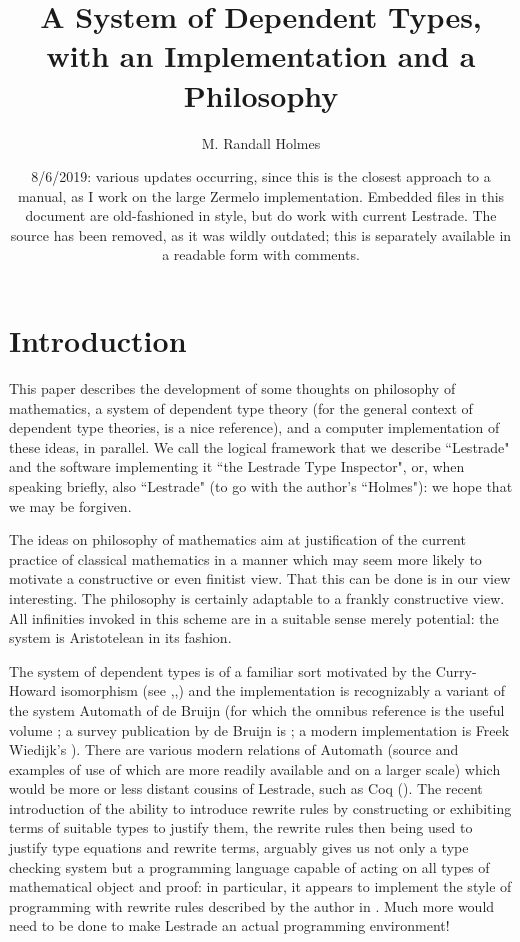 \documentclass[12pt]{article}
\title{A System of Dependent Types, with an Implementation and a Philosophy}
\author{M. Randall Holmes}
\date{8/6/2019:  various updates occurring, since this is the closest approach to a manual, as I work on the large Zermelo implementation.  Embedded files in this document are old-fashioned in style, but do work with current Lestrade.  The source has been removed, as it was wildly outdated;  this is separately available in a readable form with comments.}
\begin{document}
\maketitle

\newpage

\tableofcontents

\newpage

\section{Introduction}

This paper describes the development of some thoughts on philosophy of mathematics, a system of dependent type theory (for the general context of dependent type theories, \cite{barendregt} is a nice reference), and a computer implementation of these ideas, in parallel.  We call the logical framework that we describe ``Lestrade" and the software implementing it ``the Lestrade Type Inspector", or, when speaking briefly, also ``Lestrade"  (to go with the author's ``Holmes"):  we hope that we may be forgiven.

The ideas on philosophy of mathematics aim at justification of the current practice of classical mathematics in a manner which may seem more likely to motivate a constructive or even finitist view.  That this can be done is in our view interesting.   The philosophy is certainly adaptable to a frankly constructive view.  All infinities invoked in this scheme are in a suitable sense merely potential:  the system is Aristotelean in its fashion.

The system of dependent types is of a familiar sort motivated by the Curry-Howard isomorphism (see \cite{curryfeys},\cite{howard},\cite{debruijntypes}) and the implementation is recognizably a variant of the system Automath of de Bruijn (for which the omnibus reference is the useful volume \cite{automathbook}; a survey publication by de Bruijn is \cite{thelanguage};  a modern implementation is Freek Wiedijk's \cite{freek}).  There are various modern relations of Automath (source and examples of use of which are more readily available and on a larger scale) which would be more or less distant cousins of Lestrade, such as Coq  (\cite{coq}).  The recent introduction of the ability to introduce rewrite rules by constructing or exhibiting terms of suitable types to justify them, the rewrite rules then being used to justify type equations and rewrite terms, arguably gives us not only a type checking system but a programming language capable of acting on all types of mathematical object and proof:  in particular, it appears to implement the style of programming with rewrite rules described by the author in \cite{holmesrewriting}.   Much more would need to be done to make Lestrade an actual programming environment!
\end{document}
